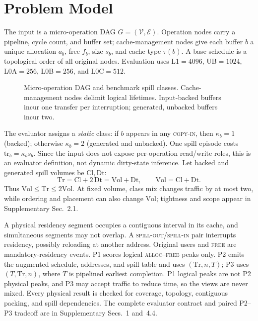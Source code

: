 \section{Problem Model}\label{sec:formulation}

The input is a micro-operation DAG $G=(\mathcal V,\mathcal E)$. Operation nodes
carry a pipeline, cycle count, and buffer set; cache-management nodes give each
buffer $b$ a unique allocation $a_b$, free $f_b$, size $s_b$, and cache type
$\tau(b)$. A base schedule is a topological order of all original nodes.
Evaluation uses L1${}=4096$, UB${}=1024$, L0A${}=256$, L0B${}=256$, and
L0C${}=512$.

\begin{figure}[t]
  \centering
  
  \caption{Micro-operation DAG and benchmark spill classes. Cache-management
  nodes delimit logical lifetimes. Input-backed buffers incur one transfer per
  interruption; generated, unbacked buffers incur two.}
  \label{fig:dag-example}
\end{figure}

The evaluator assigns a \emph{static} class: if $b$ appears in any
\textsc{copy-in}, then $\kappa_b=1$ (backed); otherwise $\kappa_b=2$
(generated and unbacked). One spill episode costs
$\mathrm{tr}_b=\kappa_b s_b$. Since the input does not expose per-operation
read/write roles, this is an evaluator definition, not dynamic dirty-state
inference. Let backed and generated spill volumes be $\mathrm{Cl},\mathrm{Dt}$:
\begin{equation}\label{eq:extra-decomp}
 \mathrm{Tr}=\mathrm{Cl}+2\,\mathrm{Dt}=\mathrm{Vol}+\mathrm{Dt},
 \qquad \mathrm{Vol}=\mathrm{Cl}+\mathrm{Dt}.
\end{equation}
Thus $\mathrm{Vol}\le\mathrm{Tr}\le2\mathrm{Vol}$. At fixed volume, class mix
changes traffic by at most two, while ordering and placement can also change
$\mathrm{Vol}$; tightness and scope appear in Supplementary Sec.~2.1.

A physical residency segment occupies a contiguous interval in its cache, and
simultaneous segments may not overlap. A \textsc{spill-out}/\textsc{spill-in}
pair interrupts residency, possibly reloading at another address. Original
users and \textsc{free} are mandatory-residency events. P1 scores logical
\textsc{alloc}--\textsc{free} peaks only. P2 emits the augmented schedule,
addresses, and spill table and uses $(\mathrm{Tr},n,T)$; P3 uses
$(T,\mathrm{Tr},n)$, where $T$ is pipelined earliest completion. P1 logical
peaks are not P2 physical peaks, and P3 may accept traffic to reduce time, so
the views are never mixed. Every physical result is checked for coverage,
topology, contiguous packing, and spill dependencies. The complete evaluator
contract and paired P2--P3 tradeoff are in Supplementary Secs.~1 and~4.4.
